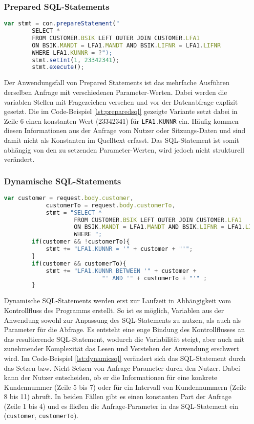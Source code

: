\subsubsection{Prepared SQL-Statements}

	\begin{lstlisting}[caption={Prepared Statements eingebettet im Quelltext}, label={lst:preparedsql}, language=JavaScript]
		var stmt = con.prepareStatement("
		SELECT *
		FROM CUSTOMER.BSIK LEFT OUTER JOIN CUSTOMER.LFA1
		ON BSIK.MANDT = LFA1.MANDT AND BSIK.LIFNR = LFA1.LIFNR
		WHERE LFA1.KUNNR = ?");
		stmt.setInt(1, 23342341);
		stmt.execute();
	\end{lstlisting}

Der Anwendungsfall von Prepared Statements ist das mehrfache Ausführen derselben Anfrage mit verschiedenen Parameter-Werten.
Dabei werden die variablen Stellen mit Fragezeichen versehen und vor der Datenabfrage explizit gesetzt.
Die im Code-Beispiel \ref{lst:preparedsql} gezeigte Variante setzt dabei in Zeile 6 einen konstanten Wert (23342341) für \texttt{LFA1.KUNNR} ein.
Häufig kommen diesen Informationen aus der Anfrage vom Nutzer oder Sitzungs-Daten und sind damit nicht als Konstanten im Quelltext erfasst.
Das SQL-Statement ist somit abhängig von den zu setzenden Parameter-Werten, wird jedoch nicht strukturell verändert.

\subsubsection{Dynamische SQL-Statements}

	\begin{lstlisting}[caption={Dynamische SQL-Statements können verschiedene Ausprägungen annehmen.}, label={lst:dynamicsql}, language=JavaScript]
		var customer = request.body.customer,
		    customerTo = request.body.customerTo,
		    stmt = "SELECT *
					FROM CUSTOMER.BSIK LEFT OUTER JOIN CUSTOMER.LFA1
					ON BSIK.MANDT = LFA1.MANDT AND BSIK.LIFNR = LFA1.LIFNR
					WHERE ";
		if(customer && !customerTo){
			stmt += "LFA1.KUNNR = '" + customer + "'";
		}
		if(customer && customerTo){
			stmt += "LFA1.KUNNR BETWEEN '" + customer +
							"' AND '" + customerTo + "'" ;
		}
	\end{lstlisting}

Dynamische SQL-Statements werden erst zur Laufzeit in Abhängigkeit vom Kontrollfluss des Programms erstellt.
So ist es möglich, Variablen aus der Anwendung sowohl zur Anpassung des SQL-Statements zu nutzen, als auch als Parameter für die Abfrage.
Es entsteht eine enge Bindung des Kontrollflusses an das resultierende SQL-Statement, wodurch die Variabilität steigt, aber auch mit zunehmender Komplexität das Lesen und Verstehen der Anwendung erschwert wird.
Im Code-Beispiel \ref{lst:dynamicsql} verändert sich das SQL-Statement durch das Setzen bzw. Nicht-Setzen von Anfrage-Parameter durch den Nutzer.
Dabei kann der Nutzer entscheiden, ob er die Informationen für eine konkrete Kundennummer (Zeile 5 bis 7) oder für ein Intervall von Kundennummern (Zeile 8 bis 11) abruft.
In beiden Fällen gibt es einen konstanten Part der Anfrage (Zeile 1 bis 4) und es fließen die Anfrage-Parameter in das SQL-Statement ein (\texttt{customer}, \texttt{customerTo}).

